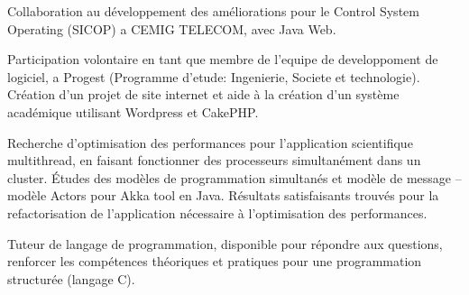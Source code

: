 \documentclass[9pt,a4paper]{altacv}
\begin{document}
\divider


Collaboration au développement des améliorations pour le Control System Operating (SICOP) a CEMIG TELECOM, avec Java Web.

\divider


Participation volontaire en tant que membre de l'equipe de developpoment de logiciel, a Progest (Programme d'etude: Ingenierie, Societe et technologie). Création d'un projet de site internet et aide à la création d'un système académique utilisant Wordpress et CakePHP.

\divider


Recherche d'optimisation des performances pour l'application scientifique multithread, en faisant fonctionner des processeurs simultanément dans un cluster. Études des modèles de programmation simultanés et modèle de message – modèle Actors pour Akka tool en Java. Résultats satisfaisants trouvés pour la refactorisation de l'application nécessaire à l'optimisation des performances.

\divider


Tuteur de langage de programmation, disponible pour répondre aux questions, renforcer les compétences théoriques et pratiques pour une programmation structurée (langage C).




\clearpage

\end{document}

